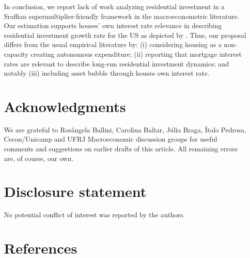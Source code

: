 \documentclass[11pt]{article}
\begin{document}
In conclusion,  we report lack of work analyzing residential investment in a Sraffian supermultiplier-friendly framework in the macroeconometric literature.
Our estimation supports houses' own interest rate relevance in describing residential investment growth rate for the US as depicted by \textcite{teixeira_crescimento_2015}.
Thus, our  proposal differs from the usual empirical literature by:
	(i) considering housing as a non-capacity creating autonomous expenditure;
	(ii) reporting that mortgage interest rates are relevant to describe long-run residential investment dynamics; and notably 
	(iii) including asset bubble through houses own interest rate.


\section*{Acknowledgments}
\label{sec:org4a09ce6}
\noindent We are grateful to Rosângela Ballini, Carolina Baltar, Júlia Braga, Ítalo Pedrosa, Cecon/Unicamp and UFRJ Macroeconomic discussion groups for useful comments and suggestions on earlier drafts of this article. All remaining errors are, of course, our own.


\section*{Disclosure statement}
\label{sec:orgb228587}
No potential conflict of interest was reported by the authors.

\section*{References}
\label{sec:org783be07}
\printbibliography[heading=none]


\appendix
\end{document}
